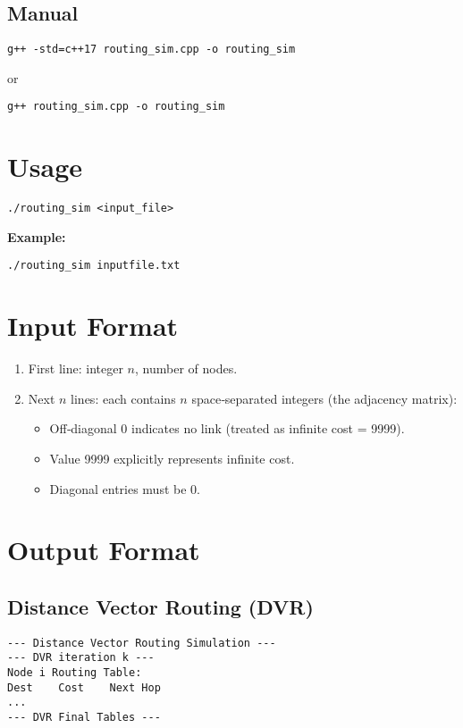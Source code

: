 \documentclass[12pt]{article}
\begin{document}
\subsection*{Manual}
\begin{verbatim}
g++ -std=c++17 routing_sim.cpp -o routing_sim 
\end{verbatim}
or
\begin{verbatim}
g++ routing_sim.cpp -o routing_sim
\end{verbatim}

\section*{Usage}
\begin{verbatim}
./routing_sim <input_file>
\end{verbatim}
\noindent\textbf{Example:}
\begin{verbatim}
./routing_sim inputfile.txt
\end{verbatim}

\section*{Input Format}
\begin{enumerate}
  \item First line: integer \(n\), number of nodes.
  \item Next \(n\) lines: each contains \(n\) space‑separated integers (the adjacency matrix):
    \begin{itemize}
      \item Off‑diagonal 0 indicates no link (treated as infinite cost = 9999).
      \item Value 9999 explicitly represents infinite cost.
      \item Diagonal entries must be 0.
    \end{itemize}
\end{enumerate}

\section*{Output Format}
\subsection*{Distance Vector Routing (DVR)}
\begin{verbatim}
--- Distance Vector Routing Simulation ---
--- DVR iteration k ---
Node i Routing Table:
Dest    Cost    Next Hop
...
--- DVR Final Tables ---
\end{verbatim}
\end{document}
